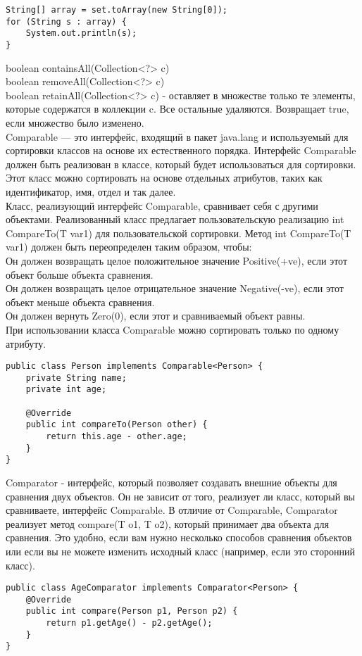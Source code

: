 {\begin{lstlisting}
String[] array = set.toArray(new String[0]);
for (String s : array) {
    System.out.println(s);
}
\end{lstlisting}
boolean containsAll(Collection<?> c) \\
boolean removeAll(Collection<?> c) \\
boolean retainAll(Collection<?> c) - оставляет в множестве только те элементы, которые содержатся в коллекции c. Все остальные удаляются. Возвращает true, если множество было изменено. \\
Comparable — это интерфейс, входящий в пакет java.lang и используемый для сортировки классов на основе их естественного порядка. Интерфейс Comparable должен быть реализован в классе, который будет использоваться для сортировки. Этот класс можно сортировать на основе отдельных атрибутов, таких как идентификатор, имя, отдел и так далее. \\

\noindent Класс, реализующий интерфейс Comparable, сравнивает себя с другими объектами. Реализованный класс предлагает пользовательскую реализацию int CompareTo(T var1) для пользовательской сортировки. Метод int CompareTo(T var1) должен быть переопределен таким образом, чтобы: \\
Он должен возвращать целое положительное значение Positive(+ve), если этот объект больше объекта сравнения. \\
Он должен возвращать целое отрицательное значение Negative(-ve), если этот объект меньше объекта сравнения. \\
Он должен вернуть Zero(0), если этот и сравниваемый объект равны. \\
При использовании класса Comparable можно сортировать только по одному атрибуту. \\
\begin{lstlisting}
public class Person implements Comparable<Person> {
    private String name;
    private int age;

    @Override
    public int compareTo(Person other) {
        return this.age - other.age; 
    }
}

\end{lstlisting}
Comparator - интерфейс, который позволяет создавать внешние объекты для сравнения двух объектов. Он не зависит от того, реализует ли класс, который вы сравниваете, интерфейс Comparable. В отличие от Comparable, Comparator реализует метод compare(T o1, T o2), который принимает два объекта для сравнения. Это удобно, если вам нужно несколько способов сравнения объектов или если вы не можете изменить исходный класс (например, если это сторонний класс).
\begin{lstlisting}
public class AgeComparator implements Comparator<Person> {
    @Override
    public int compare(Person p1, Person p2) {
        return p1.getAge() - p2.getAge(); 
    }
}


\end{lstlisting}}
